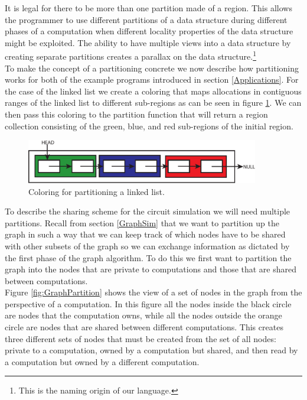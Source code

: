 \documentclass{article}
\theoremstyle{definition}
\begin{document}
\noindent
It is legal for there to be more than one partition made of a region.  This allows
the programmer to use different partitions of a data structure during different
phases of a computation when different locality properties of the data structure
might be exploited.  The ability to have multiple views into a data structure by
creating separate partitions creates a parallax on the data structure.\footnote{This 
is the naming origin of our language.}\\

\noindent
To make the concept of a partitioning concrete we now describe how partitioning
works for both of the example programs introduced in section \ref{Applications}.
For the case of the linked list we create a coloring that maps allocations in
contiguous ranges of the linked list to different sub-regions as can be
seen in figure \ref{fig:LinkedListColor}.  We can then pass
this coloring to the partition function that will return a region collection consisting
of the green, blue, and red sub-regions of the initial region. \\

\begin{figure}[t]
\centering
\includegraphics[width=4in]{figs/LinkedListPartition.pdf}
\caption{Coloring for partitioning a linked list. \label{fig:LinkedListColor}}
\end{figure}

\noindent
To describe the sharing scheme for the circuit simulation we will need
multiple partitions.  Recall from section \ref{GraphSim} that we want to
partition up the graph in such a way that we can keep track of which nodes
have to be shared with other subsets of the graph so we can exchange information
as dictated by the first phase of the graph algorithm.  To do this we first want
to partition the graph into the nodes that are private to computations
and those that are shared between computations.\\  

\noindent
Figure \ref{fig:GraphPartition}
shows the view of a set of nodes in the graph from the perspective of a
computation.  In this figure all the nodes inside the black circle
are nodes that the computation owns, while all the nodes outside the orange circle
are nodes that are shared between different computations.  This creates three
different sets of nodes that must be created from the set of all nodes: private
to a computation, owned by a computation but shared, and then read by a computation
but owned by a different computation. \\
\end{document}

